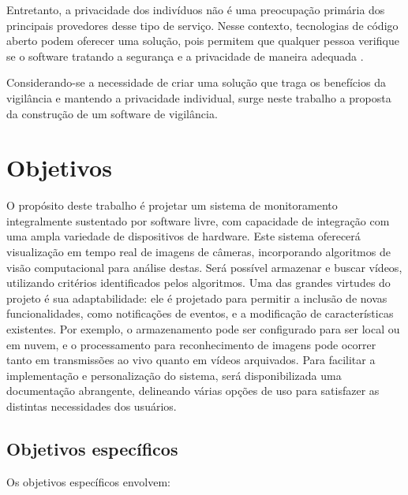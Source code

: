 \documentclass[12pt, %
openright, 
oneside, %
a4paper,    %
brazil]{facom-ufu-abntex2}
\begin{document}
Entretanto, a privacidade dos indivíduos não é uma preocupação primária dos
principais provedores desse tipo de serviço. Nesse contexto, tecnologias de
código aberto podem oferecer uma solução, pois permitem que qualquer pessoa
verifique se o software tratando a segurança e a privacidade de maneira
adequada \cite{mardjan2016open}.

Considerando-se a necessidade de criar uma solução que traga os benefícios da
vigilância e mantendo a privacidade individual, surge neste trabalho a proposta
da construção de um software de vigilância.

\section{Objetivos}

O propósito deste trabalho é projetar um sistema de monitoramento integralmente
sustentado por software livre, com capacidade de integração com uma ampla
variedade de dispositivos de hardware. Este sistema oferecerá visualização em
tempo real de imagens de câmeras, incorporando algoritmos de visão
computacional para análise destas. Será possível armazenar e buscar vídeos,
utilizando critérios identificados pelos algoritmos. Uma das grandes virtudes
do projeto é sua adaptabilidade: ele é projetado para permitir a inclusão de
novas funcionalidades, como notificações de eventos, e a modificação de
características existentes. Por exemplo, o armazenamento pode ser configurado
para ser local ou em nuvem, e o processamento para reconhecimento de imagens
pode ocorrer tanto em transmissões ao vivo quanto em vídeos arquivados. Para
facilitar a implementação e personalização do sistema, será disponibilizada uma
documentação abrangente, delineando várias opções de uso para satisfazer as
distintas necessidades dos usuários.

\subsection{Objetivos específicos}

Os objetivos específicos envolvem:
\end{document}
